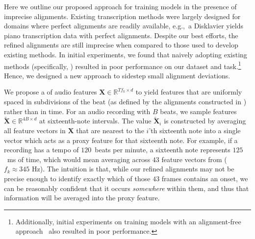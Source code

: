 Here we outline our proposed approach for training models in the presence of imprecise alignments. 
Existing transcription methods were largely designed for domains where perfect alignments are readily available, e.g.,~a Disklavier yields piano transcription data with perfect alignments. 
Despite our best efforts, the refined \hooktheory{} alignments are still imprecise when compared to those used to develop existing methods. 
In initial experiments, we found that naively adopting existing methods (specifically, \cite{hawthorne2017onsets,hawthorne2021sequence}) resulted in poor performance on our dataset and task.\footnote{Additionally, initial experiments on training models with an alignment-free approach~\cite{graves2006connectionist} also resulted in poor performance.} 
Hence, we designed a new approach to sidestep small alignment deviations.

We propose a \beatpooling{} of audio features $\bm{X} \in \mathbb{R}^{Tf_k \times d}$ to yield features that are uniformly spaced in subdivisions of the beat (as defined by the alignments constructed in ) rather than in time. 
For an audio recording with $B$ beats, we sample features $\tilde{\bm{X}} \in \mathbb{R}^{4B \times d}$ at sixteenth-note intervals. The value $\tilde{\bm{X}}_i$ is constructed by averaging all feature vectors in $\bm{X}$ that are nearest to the $i$'th sixteenth note into a single vector which acts as a proxy feature for that sixteenth note. 
For example, if a recording has a tempo of $120$~beats per minute, a sixteenth note represents $125$~ms of time, which would mean averaging across 
$43$ feature vectors from \jukebox{} (${f_k \approx 345}$ Hz). 
The intuition is that, while our refined alignments may not be precise enough to identify exactly which of those $43$ frames contains an onset, we can be reasonably confident that it occurs \emph{somewhere} within them, and thus that information will be averaged into the proxy feature.


